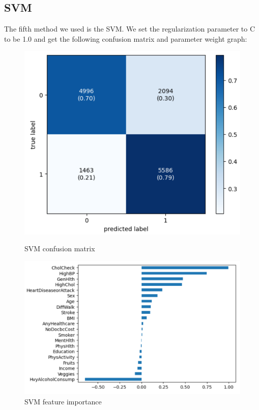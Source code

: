 \documentclass[12pt]{article}
\begin{document}
\subsection{SVM}
The fifth method we used is the SVM. We set the regularization parameter to C to be 1.0 and get the following confusion matrix and parameter weight graph:
\begin{figure}[H]
  \centering
  \begin{minipage}[b]{0.45\textwidth}
    \centering
    \includegraphics[width=0.7\linewidth]{svm_cm.png}
    \caption{SVM confusion matrix}
  \end{minipage}\hfill
  \begin{minipage}[b]{0.45\textwidth}
    \centering
    \includegraphics[width=0.7\linewidth]{svm_w.png}
    \caption{SVM feature importance}
  \end{minipage}
\end{figure}
\end{document}
